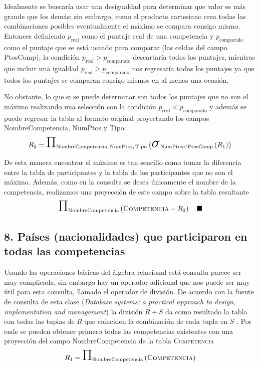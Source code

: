 \documentclass[a4paper, twoside, 12pt]{article}
\newcommand{\tblstr}[1]{\mathrm{\textsc{#1}}}
\newcommand{\select}[4]{\makebox{\huge\ensuremath{\sigma}}_{\mathrm{#1} #2 #3}\left( #4 \right)}
\newcommand{\project}[2]{\makebox{\huge\ensuremath{\Pi}}_{\mathrm{#1}} \left( #2 \right)}
\begin{document}
Idealmente se buscaría usar una desigualdad para determinar que valor es más grande que los demás; sin embargo, como el producto cartesiano crea todas las combinaciones posibles eventualmente el máximo se compara consigo mismo. Entonces definiendo $p_{\mathrm{real}}$ como el puntaje real de una competencia y $p_{\mathrm{comparado}}$ como el puntaje que se está usando para comparar (las celdas del campo PtosComp), la condición $p_{\mathrm{real}} > p_{\mathrm{comparado}}$ descartaría todos los puntajes, mientras que incluir una igualdad $p_{\mathrm{real}} \geq p_{\mathrm{comparado}}$ nos regresaría todos los puntajes ya que todos los puntajes se comparan consigo mismos en al menos una ocasión.

No obstante, lo que si se puede determinar son todos los puntajes que no son el máximo realizando una selección con la condición $p_{\mathrm{real}} < p_{\mathrm{comparado}}$ y además se puede regresar la tabla al formato original proyectando los campos NombreCompetencia, NumPtos y Tipo:
\begin{equation*}
    R_{2} = 
        \project
            {\mathrm{NombreCompetencia,\, NumPtos,\, Tipo}}
            {\select
                {NumPtos}
                {<}
                {\mathrm{PtosComp}}
                {R_{1}}}
\end{equation*}


De esta manera encontrar el máximo es tan sencillo como tomar la diferencia entre la tabla de participantes y la tabla de los participantes que no son el máximo. Además, como en la consulta se desea únicamente el nombre de la competencia, realizamos una proyección de este campo sobre la tabla resultante
\begin{equation*}
    \project
        {\mathrm{NombreCompetencia}}
        {\tblstr{Competencia} - R_{2}} \quad \blacksquare
\end{equation*}


\subsection*{8. Países (nacionalidades) que participaron en todas las competencias}

Usando las operaciones básicas del álgebra relacional está consulta parece ser muy complicada, sin embargo hay un operador adicional que nos puede ser muy útil para esta consulta, llamado el operador de división. De acuerdo con la fuente de consulta de esta clase (\textit{Database systems: a practical approach to design, implementation and management}) la división $R\div S$ da como resultado la tabla con todas las tuplas de $R$ que coinciden la combinación de cada tupla en $S$ \cite[177]{db}. Por ende se pueden obtener primero todas las competencias existentes con una proyección del campo NombreCompetencia de la tabla \textsc{Competencia}
\begin{equation*}
    R_{1} = \project
                {\mathrm{NombreCompetencia}}
                {\tblstr{Competencia}}
\end{equation*}
\end{document}
